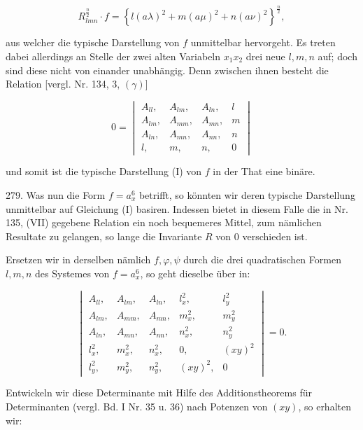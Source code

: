 \documentclass[11pt]{article}
\providecommand{\weberpage}[1]{}
\providecommand{\weq}[2]{\begin{equation}\tag{#1}#2\end{equation}}
\begin{document}
\weq{I}{R_{lmn}^{\frac{n}{2}} \cdot f = \left\{ l(a\lambda)^2 + m(a\mu)^2 + n(a\nu)^2 \right\}^{\frac{n}{2}},}

aus welcher die typische Darstellung von $f$ unmittelbar hervorgeht. Es treten dabei allerdings an Stelle der zwei alten Variabeln $x_1x_2$ drei neue $l, m, n$ auf; doch sind diese nicht von einander unabhängig. Denn zwischen ihnen besteht die Relation [vergl. Nr. 134, 3, $(\gamma)$]

\[
0 = \begin{vmatrix}
A_{ll}, & A_{lm}, & A_{ln}, & l \\
A_{lm}, & A_{mm}, & A_{mn}, & m \\
A_{ln}, & A_{mn}, & A_{nn}, & n \\
l, & m, & n, & 0
\end{vmatrix}
\]

und somit ist die typische Darstellung (I) von $f$ in der That eine binäre.


\weberpage{303}

279. Was nun die Form $f = a_x^6$ betrifft, so könnten wir deren typische Darstellung unmittelbar auf Gleichung (I) basiren. Indessen bietet in diesem Falle die in Nr. 135, (VII) gegebene Relation ein noch bequemeres Mittel, zum nämlichen Resultate zu gelangen, so lange die Invariante $R$ von $0$ verschieden ist.

Ersetzen wir in derselben nämlich $f, \varphi, \psi$ durch die drei quadratischen Formen $l, m, n$ des Systemes von $f = a_x^6$, so geht dieselbe über in:

\[
\begin{vmatrix}
A_{ll}, & A_{lm}, & A_{ln}, & l_x^2, & l_y^2 \\
A_{lm}, & A_{mm}, & A_{mn}, & m_x^2, & m_y^2 \\
A_{ln}, & A_{mn}, & A_{nn}, & n_x^2, & n_y^2 \\
l_x^2, & m_x^2, & n_x^2, & 0, & (xy)^2 \\
l_y^2, & m_y^2, & n_y^2, & (xy)^2, & 0
\end{vmatrix} = 0.
\]

Entwickeln wir diese Determinante mit Hilfe des Additionstheorems für Determinanten (vergl. Bd. I Nr. 35 u. 36) nach Potenzen von $(xy)$, so erhalten wir:
\end{document}
